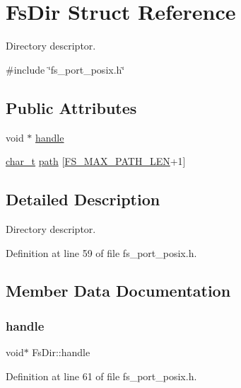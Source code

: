 \hypertarget{structFsDir}{}\section{Fs\+Dir Struct Reference}
\label{structFsDir}


Directory descriptor.  




{\ttfamily \#include \char`\"{}fs\+\_\+port\+\_\+posix.\+h\char`\"{}}

\subsection*{Public Attributes}
\begin{DoxyCompactItemize}
\item 
void $\ast$ \hyperlink{structFsDir_a5ab11d71e8bc7dd828d5d08c44452ea7}{handle}
\item 
\hyperlink{compiler__port_8h_a40bb5262bf908c328fbcfbe5d29d0201}{char\+\_\+t} \hyperlink{structFsDir_aec37a6a581778a8fc92e8e475599d2c6}{path} \mbox{[}\hyperlink{fs__port__posix_8h_aa0c6c8abe007b3bb148f7fa90f8efb39}{F\+S\+\_\+\+M\+A\+X\+\_\+\+P\+A\+T\+H\+\_\+\+L\+EN}+1\mbox{]}
\end{DoxyCompactItemize}


\subsection{Detailed Description}
Directory descriptor. 

Definition at line 59 of file fs\+\_\+port\+\_\+posix.\+h.



\subsection{Member Data Documentation}
\mbox{\label{structFsDir_a5ab11d71e8bc7dd828d5d08c44452ea7}} 
\subsubsection{\texorpdfstring{handle}{handle}}
{\footnotesize\ttfamily void$\ast$ Fs\+Dir\+::handle}



Definition at line 61 of file fs\+\_\+port\+\_\+posix.\+h.

\mbox{\label{structFsDir_aec37a6a581778a8fc92e8e475599d2c6}} 
